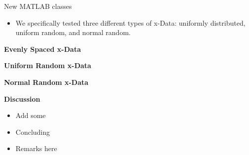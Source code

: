 \documentclass[final,mathserif]{beamer}
\newcommand{\blue}[1]{{\color{myblue}#1}}
\renewcommand{\blue}{\textcolor{blue!80!black}}
\begin{document}
\begin{frame}[fragile]
\begin{columns}[t]
\begin{column}{.31\linewidth}
\begin{block}{\blue{New MATLAB classes}}
\begin{itemize}
\item We specifically tested three different types of x-Data: uniformly distributed, uniform random, and normal random.

\end{itemize}
\end{block}

\bigskip

{{\Large \alert{\textbf{Evenly Spaced x-Data}}}}

\vspace{.1in}

\begin{block}

\end{block}

\vspace{.1in}

\bigskip

{{\Large \alert{\textbf{Uniform Random x-Data}}}}

\begin{block}

\end{block}

\vspace{.1in}

\bigskip

{{\Large \alert{\textbf{Normal Random x-Data}}}}

\vspace{.1in}

\begin{block}

\end{block}

\vspace{.1in}

\bigskip

{\Large \alert{\textbf{Discussion}}}

\vspace{.1in}

\begin{block}

\begin{itemize}
\item Add some 

\item Concluding 

\item Remarks here
\end{itemize}
\end{block}

\bigskip


\end{column}
\end{columns}
\end{frame}
\end{document}
